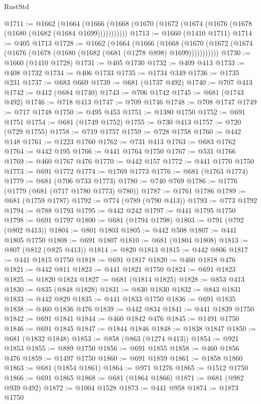 \begin{lexlean}{RustStd}
\begin{coremodule}
{\begin{coremodule}
{{{{{{{{{{{{{{{{{{{{{{{{{@1711 := @1662
    (@1664 (@1666 (@1668 (@1670 (@1672 (@1674 (@1676 (@1678 (@1680 (@1682 (@1684 @1699)))))))))))
@1713 := @1660 (@1410 @1711)
@1714 := @405 @1713
@1728 := @1662
    (@1664
      (@1666
        (@1668 (@1670 (@1672 (@1674 (@1676 (@1678 (@1680 (@1682 (@681 (@1278 @898) @1699)))))))))))
@1730 := @1660 (@1410 @1728)
@1731 := @405 @1730
@1732 := @409 @413
@1733 := @408 @1732
@1734 := @406 @1733
@1735 := @1734 @349
@1736 := @1735 @231
@1737 := @683 @669
@1739 := @681 (@1737 @492)
@1740 := @707 @413
@1742 := @412 (@684 @1740)
@1743 := @706 @1742
@1745 := @681 (@1743 @492)
@1746 := @718 @413
@1747 := @709 @1746
@1748 := @708 @1747
@1749 := @717 @1748
@1750 := @495 @453
@1751 := @1380 @1750
@1752 := @691 @1751
@1754 := @681 (@1749 @1752)
@1755 := @730 @413
@1757 := @720 (@729 @1755)
@1758 := @719 @1757
@1759 := @728 @1758
@1760 := @442 @148
@1761 := @1223 @1760
@1762 := @731 @413
@1763 := @683 @1762
@1764 := @442 @195
@1766 := @441 @1764 @1750
@1767 := @531 @1766
@1769 := @460 @1767 @476
@1770 := @442 @157
@1772 := @441 @1770 @1750
@1773 := @691 @1772
@1774 := @1769 @1773
@1776 := @681 (@1763 @1774)
@1779 := @681 (@706 @733 @1773)
@1780 := @740 @769
@1786 := @1776 (@1779 (@681 (@717 @1780 @1773) @780))
@1787 := @1761 @1786
@1789 := @681 (@1759 @1787)
@1792 := @774 (@789 (@790 @413))
@1793 := @773 @1792
@1794 := @788 @1793
@1795 := @442 @242
@1797 := @441 @1795 @1750
@1798 := @691 @1797
@1800 := @681 (@1794 @1798)
@1803 := @791 (@792 (@802 @413))
@1804 := @801 @1803
@1805 := @442 @508
@1807 := @441 @1805 @1750
@1808 := @691 @1807
@1810 := @681 (@1804 @1808)
@1813 := @807 (@812 (@825 @413))
@1814 := @820 @1813
@1815 := @442 @806
@1817 := @441 @1815 @1750
@1818 := @691 @1817
@1820 := @460 @1818 @476
@1821 := @442 @811
@1823 := @441 @1821 @1750
@1824 := @691 @1823
@1825 := @1820 @1824
@1827 := @681 (@1814 @1825)
@1828 := @853 @413
@1830 := @835 (@848 @1828)
@1831 := @830 @1830
@1832 := @843 @1831
@1833 := @442 @829
@1835 := @441 @1833 @1750
@1836 := @691 @1835
@1838 := @460 @1836 @476
@1839 := @442 @834
@1841 := @441 @1839 @1750
@1842 := @691 @1841
@1844 := @460 @1842 @476
@1845 := @1491 @1750
@1846 := @691 @1845
@1847 := @1844 @1846
@1848 := @1838 @1847
@1850 := @681 (@1832 @1848)
@1853 := @858 (@863 (@1274 @413))
@1854 := @921 @1853
@1855 := @889 @1750
@1856 := @691 @1855
@1858 := @460 @1856 @476
@1859 := @1497 @1750
@1860 := @691 @1859
@1861 := @1858 @1860
@1863 := @681 (@1854 @1861)
@1864 := @971 @1276
@1865 := @1512 @1750
@1866 := @691 @1865
@1868 := @681 (@1864 @1866)
@1871 := @681 (@982 @939 @492)
@1872 := @1004 @1528
@1873 := @441 @958
@1874 := @1873 @1750
}}}}}}}}}}}}}}}}}}}}}}}}}
\end{coremodule}}
\end{coremodule}
\end{lexlean}

